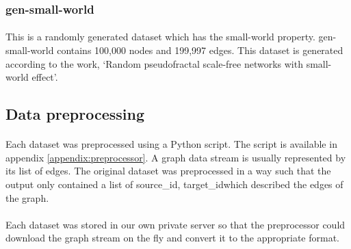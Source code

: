 \subsubsection{gen-small-world}

\paragraph{}
This is a randomly generated dataset which has the small-world property. gen-small-world contains 100,000 nodes and 199,997 edges. This dataset is generated according to the work, ‘Random pseudofractal scale-free networks with small-world effect’\cite{wang_random_2006}.

\subsection{Data preprocessing}
\label{section:soc_preprocessing}

\paragraph{}
Each dataset was preprocessed using a Python script. The script is available in appendix \ref{appendix:preprocessor}. A graph data stream is usually represented by its list of edges. The original dataset was preprocessed in a way such that the output only contained a list of \lbrack source\_id, target\_id\rbrack\space which described the edges of the graph.

\paragraph{}
Each dataset was stored in our own private server so that the preprocessor could download the graph stream on the fly and convert it to the appropriate format.